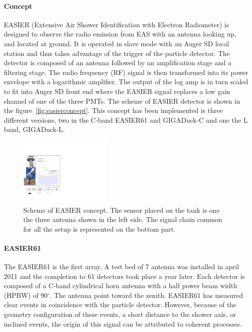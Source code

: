 \documentclass{PoS}
\begin{document}
\paragraph{Concept}
EASIER (Extensive Air Shower Identification with Electron Radiometer) is designed to observe the radio emission from EAS with an antenna looking up, and located at ground. It is operated in slave mode with an Auger SD local station and thus takes advantage of the trigger of the particle detector. The detector is composed of an antenna followed by an amplification stage and a filtering stage. The radio frequency (RF) signal is then transformed into its power envelope with a logarithmic amplifier. The output of the log amp is in turn scaled to fit into Auger SD front end where the EASIER signal replaces a low gain channel of one of the three PMTs. 
The scheme of EASIER detector is shown in the figure~\ref{fig:easierconcept}. This concept has been implemented is three different versions, two in the C-band EASIER61 and GIGADuck-C and one the L band, GIGADuck-L.
\begin{figure}[h]
\centering
\includegraphics[width=0.4\textwidth]{easierscheme.pdf}
\caption{Scheme of EASIER concept. The sensor  placed on the tank is one the three antenna shown in the left side. The signal chain common for all the setup is represented on the bottom part.}
\label{fig:easierscheme}
\end{figure}

\paragraph{EASIER61}
The EASIER61 is the first array. A test bed of 7 antenna was installed in april 2011 and the completion to 61 detectors took place a year later. Each detector is composed of a C-band cylindrical horn antenna with a half power beam width (HPBW) of 90$^\circ$. The antenna point toward the zenith. EASIER61 has measured clear events in coincidence with the particle detector. However, because of the geometry configuration of these events, a short distance to the shower axis, or  inclined events, the origin of this signal can be attributed to coherent processes.
\end{document}
